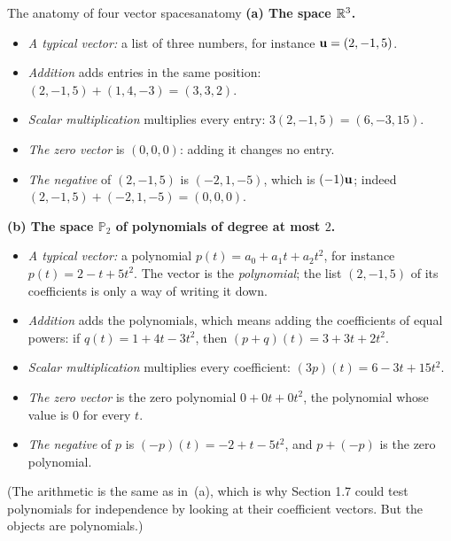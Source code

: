 \documentclass[11pt]{article}
\begin{document}
\begin{exmp}{The anatomy of four vector spaces}{anatomy}
\textbf{(a) The space $\mathbb{R}^3$.}
\begin{itemize}[itemsep=1pt]
  \item \emph{A typical vector:} a list of three numbers, for instance $\mathbf{u}=(2,-1,5)$.
  \item \emph{Addition} adds entries in the same position: $(2,-1,5)+(1,4,-3)=(3,3,2)$.
  \item \emph{Scalar multiplication} multiplies every entry: $3(2,-1,5)=(6,-3,15)$.
  \item \emph{The zero vector} is $(0,0,0)$: adding it changes no entry.
  \item \emph{The negative} of $(2,-1,5)$ is $(-2,1,-5)$, which is $(-1)\mathbf{u}$; indeed $(2,-1,5)+(-2,1,-5)=(0,0,0)$.
\end{itemize}
\textbf{(b) The space $\mathbb{P}_2$ of polynomials of degree at most $2$.}
\begin{itemize}[itemsep=1pt]
  \item \emph{A typical vector:} a polynomial $p(t)=a_0+a_1t+a_2t^2$, for instance $p(t)=2-t+5t^2$. The vector is the \emph{polynomial}; the list $(2,-1,5)$ of its coefficients is only a way of writing it down.
  \item \emph{Addition} adds the polynomials, which means adding the coefficients of equal powers: if $q(t)=1+4t-3t^2$, then $(p+q)(t)=3+3t+2t^2$.
  \item \emph{Scalar multiplication} multiplies every coefficient: $(3p)(t)=6-3t+15t^2$.
  \item \emph{The zero vector} is the zero polynomial $0+0t+0t^2$, the polynomial whose value is $0$ for every $t$.
  \item \emph{The negative} of $p$ is $(-p)(t)=-2+t-5t^2$, and $p+(-p)$ is the zero polynomial.
\end{itemize}
(The arithmetic is the same as in~(a), which is why Section 1.7 could test polynomials for independence by looking at their coefficient vectors. But the objects are polynomials.)


\end{exmp}
\end{document}
